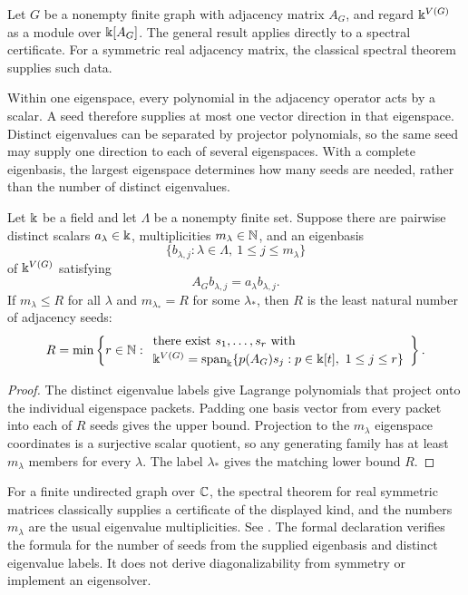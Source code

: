 Let $G$ be a nonempty finite graph with adjacency matrix $A_G$, and regard
$\Bbbk^{V(G)}$ as a module over $\Bbbk[A_G]$.  The general result applies directly to a spectral certificate. For a symmetric real adjacency matrix, the classical spectral theorem supplies such data.

Within one eigenspace, every polynomial in the adjacency operator acts by a scalar. A seed therefore supplies at most one vector direction in that eigenspace. Distinct eigenvalues can be separated by projector polynomials, so the same seed may supply one direction to each of several eigenspaces. With a complete eigenbasis, the largest eigenspace determines how many seeds are needed, rather than the number of distinct eigenvalues.

\begin{corollary}
\label{cor:graph-rank}
Let $\Bbbk$ be a field and let $\Lambda$ be a nonempty finite set.  Suppose
there are pairwise distinct scalars $a_{\lambda}\in\Bbbk$, multiplicities
$m_{\lambda}\in\mathbb N$, and an eigenbasis
\[
\{b_{\lambda,j}:\lambda\in\Lambda,\ 1\le j\le m_{\lambda}\}
\]
of $\Bbbk^{V(G)}$ satisfying
\[
A_Gb_{\lambda,j}=a_{\lambda}b_{\lambda,j}.
\]
If $m_{\lambda}\le R$ for all $\lambda$ and
$m_{\lambda_*}=R$ for some $\lambda_*$, then $R$ is the least natural number
of adjacency seeds:
\[
{
R=\min\left\{r\in\mathbb N:
\begin{array}{l}
\text{there exist }s_1,\ldots,s_r\text{ with}\\[2pt]
\Bbbk^{V(G)}=\operatorname{span}_{\Bbbk}
  \{p(A_G)s_j:p\in\Bbbk[t],\ 1\le j\le r\}
\end{array}
\right\}.
}
\]
\end{corollary}

\begin{proof}
The distinct eigenvalue labels give Lagrange polynomials that project onto
the individual eigenspace packets.  Padding one basis vector from every
packet into each of $R$ seeds gives the upper bound.  Projection to the
$m_{\lambda}$ eigenspace coordinates is a surjective scalar quotient, so any
generating family has at least $m_{\lambda}$ members for every $\lambda$.
The label $\lambda_*$ gives the matching lower bound $R$.
\end{proof}

\begin{boundary}
For a finite undirected graph over $\mathbb C$, the spectral theorem for real symmetric matrices
classically supplies a certificate of the displayed kind, and the numbers
$m_{\lambda}$ are the usual eigenvalue multiplicities. See
\cite{brouwerHaemers2012}.  The formal declaration verifies the
formula for the number of seeds from the supplied eigenbasis and distinct eigenvalue
labels.  It does not derive diagonalizability from symmetry or implement an
eigensolver.
\end{boundary}

